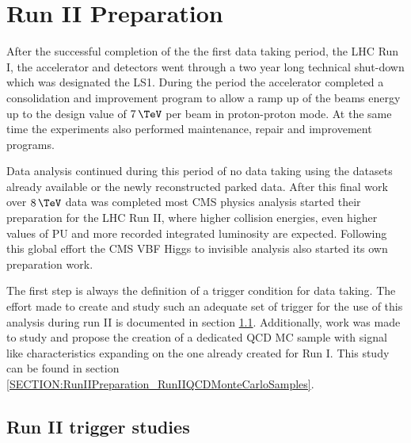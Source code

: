 \chapter{Run II Preparation}
\label{CHAPTER:RunIIPreparation}

\glsresetall %


After the successful completion of the the first data taking period, the \gls{LHC} Run I, the accelerator and detectors went through a two year long technical shut-down which was designated the \gls{LS1}. During the period the accelerator completed a consolidation and improvement program to allow a ramp up of the beams energy up to the design value of $7\,\TeV$ per beam in proton-proton mode. At the same time the experiments also performed maintenance, repair and improvement programs. 

Data analysis continued during this period of no data taking using the datasets already available or the newly reconstructed parked data. After this final work over $8\,\TeV$ data was completed most \gls{CMS} physics analysis started their preparation for the \gls{LHC} Run II, where higher collision energies, even higher values of \gls{PU} and more recorded integrated luminosity are expected. Following this global effort the \gls{CMS} \gls{VBF} Higgs to invisible analysis also started its own preparation work. 

The first step is always the definition of a trigger condition for data taking. The effort made to create and study such an adequate set of trigger for the use of this analysis during run II is documented in section \ref{SECTION:RunIITriggerStudies}. Additionally, work was made to study and propose the creation of a dedicated \gls{QCD} \gls{MC} sample with signal like characteristics expanding on the one already created for Run I. This study can be found in section \ref{SECTION:RunIIPreparation_RunIIQCDMonteCarloSamples}.

\section{Run II trigger studies}
\label{SECTION:RunIITriggerStudies}

% 
%

